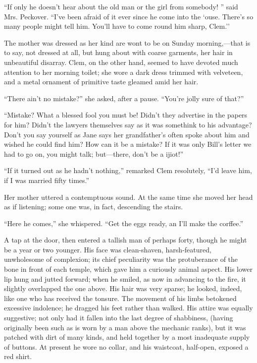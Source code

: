 ``If only he doesn't hear about the old man or the girl from somebody!
'' said Mrs. Peckover. ``I've been afraid of it ever since he come into
the `ouse. There's so many people might tell him. You'll have to come
round him sharp, Clem.''

The mother was dressed as her kind are wont to be on Sunday
morning,---that is to say, not dressed at all, but hung about with
coarse garments, her hair in unbeautiful disarray. Clem, on the other
hand, seemed to have devoted much attention to her morning toilet; she
wore a dark dress trimmed with {}velveteen, and a metal ornament of
primitive taste gleamed amid her hair.

``There ain't no mistake?'' she asked, after a pause. ``You're jolly
sure of that?''

``Mistake? What a blessed fool you must be! Didn't they advertise in the
papers for him? Didn't the lawyers themselves say as it was somethink to
his advantage? Don't you say yourself as Jane says her grandfather's
often spoke about him and wished he could find him? How can it be a
mistake? If it was only Bill's letter we had to go on, you might talk;
but---there, don't be a ijiot!''

``If it turned out as he hadn't nothing,'' remarked Clem resolutely,
``I'd leave him, if I was married fifty times.''

Her mother uttered a contemptuous sound. At the same time she moved her
head as if listening; some one was, in fact, descending the stairs.

``Here he comes,'' she whispered. ``Get the eggs ready, an I'll make the
corffee.''

A tap at the door, then entered a tallish {}man of perhaps forty, though
he might be a year or two younger. His face was clean-shaven,
harsh-featured, unwholesome of complexion; its chief peculiarity was the
protuberance of the bone in front of each temple, which gave him a
curiously animal aspect. His lower lip hung and jutted forward; when he
smiled, as now in advancing to the fire, it slightly overlapped the one
above. His hair was very sparse; he looked, indeed, like one who has
received the tonsure. The movement of his limbs betokened excessive
indolence; he dragged his feet rather than walked. His attire was
equally suggestive; not only had it fallen into the last degree of
shabbiness, (having originally been such as is worn by a man above the
mechanic ranks), but it was patched with dirt of many kinds, and held
together by a most inadequate supply of buttons. At present he wore no
collar, and his waistcoat, half-open, exposed a red shirt.

